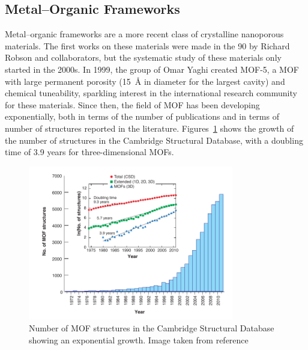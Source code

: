 \documentclass[thesis]{subfiles}
\begin{document}
\newpage
\subsection{Metal--Organic Frameworks}

Metal--organic frameworks are a more recent class of crystalline nanoporous
materials. The first works on these materials were made in the 90 by Richard
Robson and collaborators\cite{Abrahams1991, Robson2008}, but the systematic
study of these materials only started in the 2000s. In 1999, the group of Omar
Yaghi created MOF-5\cite{Li1999}, a MOF with large permanent porosity
(\SI{15}{\AA} in diameter for the largest cavity) and chemical tuneability,
sparkling interest in the international research community for these materials.
Since then, the field of MOF has been developing exponentially, both in terms of
the number of publications and in terms of number of structures reported in the
literature. Figures~\ref{fig:number-of-mofs} shows the growth of the number of
structures in the Cambridge Structural Database, with a doubling time of 3.9
years for three-dimensional MOFs.

\begin{figure}[ht]
    \centering
    \includegraphics[width=0.8\textwidth]{figures/cited/number-of-mofs}
    \caption{Number of MOF structures in the Cambridge Structural Database
    showing an exponential growth. Image taken from reference~\cite{Furukawa2013}}
    \label{fig:number-of-mofs}
\end{figure}
\end{document}
